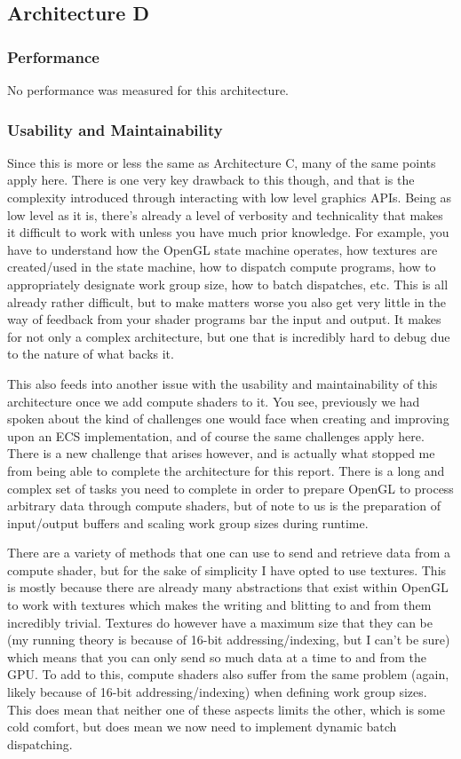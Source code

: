 \documentclass{article}
\begin{document}
\subsection{Architecture D}
\subsubsection{Performance}
No performance was measured for this architecture.

\subsubsection{Usability and Maintainability}
Since this is more or less the same as Architecture C, many of the same points
apply here. There is one very key drawback to this though, and that is the
complexity introduced through interacting with low level graphics APIs. Being
as low level as it is, there's already a level of verbosity and technicality
that makes it difficult to work with unless you have much prior knowledge. For
example, you have to understand how the OpenGL state machine operates, how
textures are created/used in the state machine, how to dispatch compute
programs, how to appropriately designate work group size, how to batch
dispatches, etc. This is all already rather difficult, but to make matters worse
you also get very little in the way of feedback from your shader programs bar
the input and output. It makes for not only a complex architecture, but one that
is incredibly hard to debug due to the nature of what backs it.

This also feeds into another issue with the usability and maintainability of
this architecture once we add compute shaders to it. You see, previously we had
spoken about the kind of challenges one would face when creating and improving
upon an ECS implementation, and of course the same challenges apply here. There
is a new challenge that arises however, and is actually what stopped me from
being able to complete the architecture for this report. There is a long and
complex set of tasks you need to complete in order to prepare OpenGL to process
arbitrary data through compute shaders, but of note to us is the preparation of
input/output buffers and scaling work group sizes during runtime.

There are a variety of methods that one can use to send and retrieve data from
a compute shader, but for the sake of simplicity I have opted to use textures.
This is mostly because there are already many abstractions that exist within
OpenGL to work with textures which makes the writing and blitting to and from
them incredibly trivial. Textures do however have a maximum size that they can
be (my running theory is because of 16-bit addressing/indexing, but I can't be
sure) which means that you can only send so much data at a time to and from the
GPU. To add to this, compute shaders also suffer from the same problem (again,
likely because of 16-bit addressing/indexing) when defining work group sizes.
This does mean that neither one of these aspects limits the other, which is some
cold comfort, but does mean we now need to implement dynamic batch dispatching.
\end{document}
